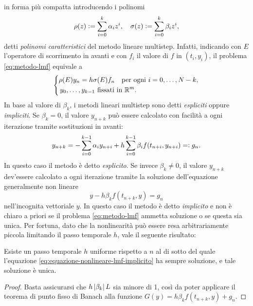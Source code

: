 in forma più compatta introducendo i polinomi
\[
\rho(z) \vcentcolon= \sum_{i=0}^k \alpha_i z^i,
\quad \sigma(z) \vcentcolon= \sum_{i=0}^k \beta_i z^i,
\]
detti \emph{polinomi caratteristici} del metodo lineare multistep.
Infatti, indicando con $E$ l'operatore di scorrimento in avanti
e con $f_i$ il valore di $f$ in $(t_i,y_i)$,
il problema \eqref{eq:metodo-lmf} equivale a
\begin{equation} \label{eq:metodo-lmf-rho-sigma}
\left\{
\begin{aligned}
& \rho(E) y_n = h \sigma(E) f_n \quad \text{per ogni $i=0,\dots,N-k$}, \\
& \, \text{$y_0,\dots,y_{k-1}$ fissati in $\mathbb{R}^m$}.
\end{aligned}
\right.
\end{equation}
In base al valore di $\beta_k$, i metodi lineari multistep sono
detti \emph{espliciti} oppure \emph{impliciti}.
Se $\beta_k = 0$, il valore $y_{n+k}$ può essere calcolato con facilità
a ogni iterazione tramite sostituzioni in avanti:
\[
y_{n+k} = - \sum_{i=0}^{k-1} \alpha_i y_{n+i}
        + h \sum_{i=0}^{k-1} \beta_i f(t_{n+i},y_{n+i})
        =\vcentcolon g_n.
\]
In questo caso il metodo è detto \emph{esplicito}.
Se invece $\beta_k \neq 0$, il valore $y_{n+k}$ dev'essere calcolato
a ogni iterazione tramite la soluzione dell'equazione generalmente non lineare
\begin{equation}\label{eq:equazione-nonlineare-lmf-implicito}
y - h \beta_k f(t_{n+k},y) = g_n
\end{equation}
nell'incognita vettoriale $y$. In questo caso il metodo è detto \emph{implicito}
e non è chiaro a priori se il problema \eqref{eq:metodo-lmf} ammetta
soluzione o se questa sia unica. Per fortuna, dato che la nonlinearità
può essere resa arbitrariamente piccola limitando il passo temporale $h$,
vale il seguente risultato:
\begin{teor}
Esiste un passo temporale $h$ uniforme rispetto a $n$ al di sotto del quale
l'equazione \eqref{eq:equazione-nonlineare-lmf-implicito} ha sempre soluzione,
e tale soluzione è unica.
\end{teor}
\begin{proof}
Basta assicurarsi che $h \left\lvert\beta_k\right\rvert L$ sia minore di 1, così da poter
applicare il teorema di punto fisso di Banach alla funzione 
$G(y) = h \beta_k f(t_{n+k},y) + g_n$.
\end{proof}


